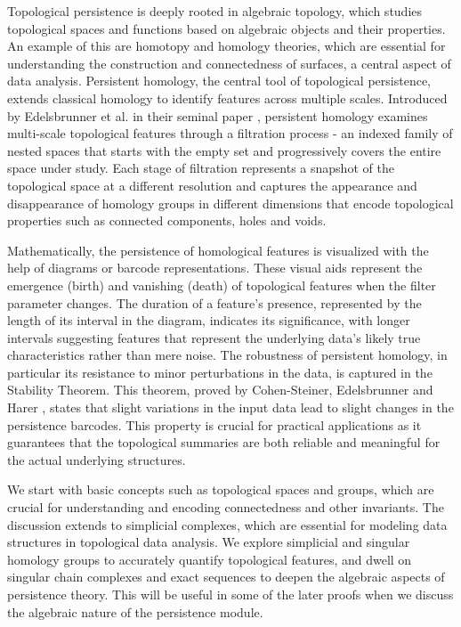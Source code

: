 \label{TopologicalSpaces}
Topological persistence is deeply rooted in algebraic topology, which studies topological
spaces and functions based on algebraic objects and their properties. An example
of this are homotopy and homology theories, which are essential for understanding
the construction and connectedness of surfaces, a central aspect of data
analysis. Persistent homology, the central tool of topological persistence, extends
classical homology to identify features across multiple scales. Introduced by
Edelsbrunner et al. in their seminal paper \cite{edelsbrunner2000triangulations},
persistent homology examines multi-scale topological features through a
filtration process - an indexed family of nested spaces that starts with the
empty set and progressively covers the entire space under study. Each stage of filtration
represents a snapshot of the topological space at a different resolution and captures
the appearance and disappearance of homology groups in different dimensions that
encode topological properties such as connected components, holes and voids.

Mathematically, the persistence of homological features is visualized with the help
of diagrams or barcode representations. These visual aids represent the
emergence (birth) and vanishing (death) of topological features when the filter
parameter changes. The duration of a feature's presence, represented by the
length of its interval in the diagram, indicates its significance, with longer
intervals suggesting features that represent the underlying data's likely true
characteristics rather than mere noise. The robustness of persistent homology,
in particular its resistance to minor perturbations in the data, is captured in the
Stability Theorem. This theorem, proved by Cohen-Steiner, Edelsbrunner and Harer
\cite{bendich2007inferring}, states that slight variations in the input data lead
to slight changes in the persistence barcodes. This property is crucial for
practical applications as it guarantees that the topological summaries are both
reliable and meaningful for the actual underlying structures.

We start with basic concepts such as topological spaces and groups, which are crucial
for understanding and encoding connectedness and other invariants. The
discussion extends to simplicial complexes, which are essential for modeling data
structures in topological data analysis. We explore simplicial and singular
homology groups to accurately quantify topological features, and dwell on singular
chain complexes and exact sequences to deepen the algebraic aspects of persistence theory. This will be useful in some of the later proofs when we discuss the algebraic
nature of the persistence module.


